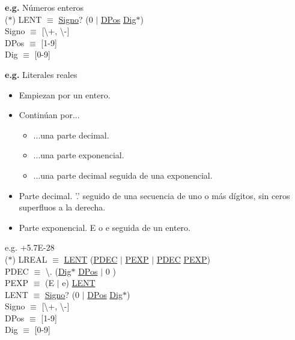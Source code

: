 \documentclass[\main/Apuntes_PL.tex]{subfiles}
\begin{document}
      \bigskip
      \par
      \textbf{e.g.} Números enteros\\
      \hspace{5mm}($\ast$) LENT $\equiv$ \underline{Signo}? (0 $\mid$ \underline{DPos} \underline{Dig}$\ast$) \\
      \hspace{10mm} Signo $\equiv$ [\textbackslash+, \textbackslash-] \\
      \hspace{10mm} DPos  $\equiv$ [1-9] \\
      \hspace{10mm} Dig   $\equiv$ [0-9]

      \bigskip
      \par
      \textbf{e.g.} Literales reales
      \begin{itemize}
        \item Empiezan por un entero.
        \item Continúan por...
          \begin{itemize}
            \item ...una parte decimal.
            \item ...una parte exponencial.
            \item ...una parte decimal seguida de una exponencial.
          \end{itemize}
        \item Parte decimal. '.' seguido de una secuencia de uno o más dígitos, sin ceros superfluos a la derecha.
        \item Parte exponencial. E o e seguida de un entero.
      \end{itemize}
      \hspace{10mm}e.g. +5.7E-28\\
      \bigskip
      \hspace{5mm}($\ast$) LREAL $\equiv$ \underline{LENT} (\underline{PDEC} $\mid$ \underline{PEXP} $\mid$ \underline{PDEC} \underline{PEXP}) \\
      \hspace{10mm} PDEC $\equiv$ \textbackslash. (\underline{Dig}$\ast$ \underline{DPos} $\mid$ 0 ) \\
      \hspace{10mm} PEXP $\equiv$ (E $\mid$ e) \underline{LENT} \\
      \vspace{2mm}
      \hspace{10mm} LENT $\equiv$ \underline{Signo}? (0 $\mid$ \underline{DPos} \underline{Dig}$\ast$) \\
      \hspace{10mm} Signo $\equiv$ [\textbackslash+, \textbackslash-] \\
      \hspace{10mm} DPos  $\equiv$ [1-9] \\
      \hspace{10mm} Dig   $\equiv$ [0-9]
\end{document}

